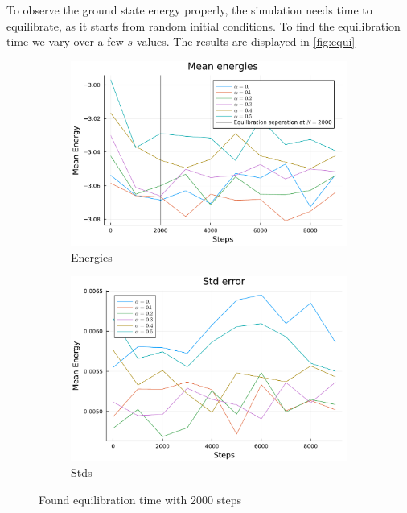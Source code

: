 \documentclass[
	a4paper, %
	10pt, %
]{CSUniSchoolLabReport}
\begin{document}
To observe the ground state energy properly, the simulation needs time to equilibrate, as it starts from random initial conditions. To find the equilibration time we vary over a few $s$ values. The results are displayed in \autoref{fig:equi}

\begin{figure}[H]
	\begin{subfigure}[b]{0.49\textwidth}
		\centering
		\includegraphics[width=\textwidth]{../saves/task1b.energies.pdf}
		\caption{Energies}
	\end{subfigure}
	\hfill
	\begin{subfigure}[b]{0.49\textwidth}
		\centering
		\includegraphics[width=\textwidth]{../saves/task1b.stds.pdf}
		\caption{Stds}
	\end{subfigure}
	\caption{Found equilibration time with 2000 steps}
	\label{fig:equi}
\end{figure}
\end{document}
